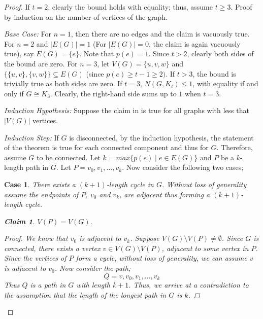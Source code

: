 \documentclass[pdflatex,sn-basic,Numbered]{sn-jnl}
\newtheorem{cl}{Claim}
\newtheorem{case}{Case}
\begin{document}
\begin{proof}
    If $t = 2$, clearly the bound holds with equality; thus, assume $t \geq 3$.
    \newline Proof by induction on the number of vertices of the graph.
    \vspace{2mm}

    \noindent\textit{Base Case:} For $n =1$, then there are no edges and the claim is vacuously true.
    \newline For $n=2$ and $|E(G)| =1$ (For $|E(G)| = 0$, the claim is again vacuously true), say $E(G) =\{e\}$. Note that $p(e) =1$. Since $t>2$, clearly both sides of the bound are zero. For $n = 3$, let $V(G) = \{u,v,w\}$ and $ \{\{u,v\},\{v,w\}\} \subseteq E(G)$ (since $p(e) \geq t-1 \geq 2)$. If $t >3$, the bound is trivially true as both sides are zero. If $t = 3$, $N(G,K_t) \leq 1$, with equality if and only if $G \cong K_3$. Clearly, the right-hand side sums up to $1$ when $t =3$.
    \vspace{2mm}

    \noindent\textit{Induction Hypothesis:} Suppose the claim in  is true for all graphs with less that $|V(G)|$ vertices.
     \vspace{2mm}

    \noindent\textit{Induction Step:} If $G$ is disconnected, by the induction hypothesis, the statement of the theorem is true for each connected component and thus for $G$. Therefore, assume $G$ to be connected. Let $k =max\{ p(e) \mid e \in E(G)\}$ and $P$ be a $k$-length path in $G$. Let $P = v_0,v_1,\dots,v_k$. Now consider the following two cases;
     \begin{case}\label{case1}
        There exists a $(k+1)$-length cycle in $G$.
        \newline Without loss of generality assume the endpoints of $P$, $v_0$ and $v_k$, are adjacent thus forming a $(k+1)$-length cycle.
        \begin{cl}\label{cl3.4}
     $V(P) = V(G)$.
 \end{cl}
\begin{proof}
          We know that $v_0$ is adjacent to $v_k$. Suppose $V(G) \setminus V(P) \neq \emptyset$. Since $G$ is connected, there exists a vertex  $v \in V(G)\setminus V(P)$, adjacent to some vertex in $P$. Since the vertices of $P$ form a cycle, without loss of generality, we can assume $v$ is adjacent to $v_0$. Now consider the path;
         \begin{equation*}
             Q = v,v_0,v_1,\dots,v_{k}
         \end{equation*}
Thus $Q$ is a path in $G$ with length $k +1$. Thus, we arrive at a contradiction to the assumption that the length of the longest path in $G$ is $k$.  \end{proof}
 

\end{case}
\end{proof}
\end{document}
